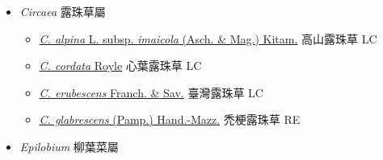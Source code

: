 
  \begin{itemize}
 \item[] \textit{Circaea} 露珠草屬
                    
  \begin{itemize}
        \item[] \href{http://www.theplantlist.org/tpl1.1/search?q=Circaea+alpina+subsp.+imaicola}{\textit{C. alpina} L. subsp. \textit{imaicola} (Asch. \& Mag.) Kitam.}   高山露珠草 LC
        \item[] \href{http://www.theplantlist.org/tpl1.1/search?q=Circaea+cordata}{\textit{C. cordata} Royle}   心葉露珠草 LC
        \item[] \href{http://www.theplantlist.org/tpl1.1/search?q=Circaea+erubescens}{\textit{C. erubescens} Franch. \& Sav.}   臺灣露珠草 LC
        \item[] \href{http://www.theplantlist.org/tpl1.1/search?q=Circaea+glabrescens}{\textit{C. glabrescens} (Pamp.) Hand.-Mazz.}   禿梗露珠草 RE
  \end{itemize}
 \item[] \textit{Epilobium} 柳葉菜屬
                    

\end{itemize}
